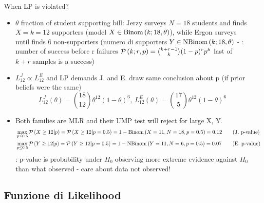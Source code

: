 \documentclass[asd-beamer.tex]{subfiles}
\begin{document}
\begin{frame}{When LP is violated?}
\begin{itemize}
\item $\theta$ fraction of student supporting bill: Jerzy surveys $N=18$ students and finds $X=k=12$ supporters (model $X\in\operatorname{Binom}{(k;18,\theta)}$), while Ergon surveys until finds 6 non-supporters (numero di supporters $Y\in\operatorname{NBinom}{(k;18,\theta)}$ - : number of success before r failures $\operatorname{\mathcal{P}}{(k;r,p)}=\binom{k+r-1}{k}(1-p)^rp^k$ last of $k+r$ samples is a success)
\item $L^J_{12}\propto L^E_{12}$ and LP demands J. and E. draw same conclusion about p (if prior beliefs were the same)\[L^J_{12}(\theta)=\binom{18}{12}\theta^{12}(1-\theta)^6,\ L^E_{12}(\theta)=\binom{17}{5}\theta^{12}(1-\theta)^6\]
\item Both families are MLR and their UMP test will reject for large X, Y.
\begin{align*}
&\max_{p\leq0.5}\operatorname{\mathcal{P}}{(X\geq12|p)}=\operatorname{\mathcal{P}}{(X\geq12|p=0.5)}=1-\operatorname{Binom}{(X=11,N=18,p=0.5)}=0.12\tag{J. p-value}\\
&\max_{p\leq0.5}\operatorname{\mathcal{P}}{(Y\geq12|p)}=\operatorname{\mathcal{P}}{(Y\geq12|p=0.5)}=1-\operatorname{NBinom}{(Y=11,N=6,p=0.5)}=0.07\tag{E. p-value}
\end{align*}
: p-value is probability under $H_0$ observing more extreme evidence against $H_0$ than what observed - care about data not observed!
\end{itemize}
\end{frame}


\subsection{Funzione di Likelihood}
\end{document}
